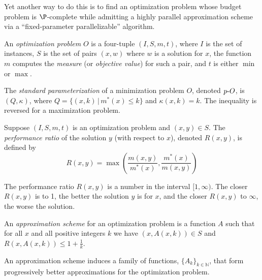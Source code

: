 \documentclass{article}
\newcommand{\dash}{\textnormal{-}}
\begin{document}
Yet another way to do this is to find an optimization problem whose budget problem is $\P$-complete while admitting a highly parallel approximation scheme via a ``fixed-parameter parallelizable'' algorithm.

\begin{definition}
  An \emph{optimization problem} $O$ is a four-tuple $(I, S, m, t)$, where $I$ is the set of instances, $S$ is the set of pairs $(x, w)$ where $w$ is a solution for $x$, the function $m$ computes the \emph{measure} (or \emph{objective value}) for such a pair, and $t$ is either $\min$ or $\max$.
\end{definition}

\begin{definition}
  The \emph{standard parameterization} of a minimization problem $O$, denoted $p\dash{O}$, is $(Q, \kappa)$, where $Q = \{ (x, k) \, | \, m^*(x) \leq k \}$ and $\kappa(x, k) = k$.
  The inequality is reversed for a maximization problem.
\end{definition}

\begin{definition}
  Suppose $(I, S, m, t)$ is an optimization problem and $(x, y) \in S$.
  The \emph{performance ratio} of the solution $y$ (with respect to $x$), denoted $R(x, y)$, is defined by
  \[
  R(x, y) = \max \left(\frac{m(x, y)}{m^*(x)}, \frac{m^*(x)}{m(x, y)}\right)
  \]
\end{definition}

The performance ratio $R(x, y)$ is a number in the interval $[1, \infty)$.
The closer $R(x, y)$ is to 1, the better the solution $y$ is for $x$, and the closer $R(x, y)$ to $\infty$, the worse the solution.

\begin{definition}
  An \emph{approximation scheme} for an optimization problem is a function $A$ such that for all $x$ and all positive integers $k$ we have $(x, A(x, k)) \in S$ and $R(x, A(x, k)) \leq 1 + \frac{1}{k}$.
\end{definition}

An approximation scheme induces a family of functions, $\{A_k\}_{k \in \mathbb{N}}$, that form progressively better approximations for the optimization problem.

\end{document}
